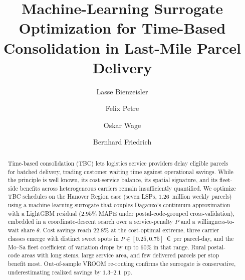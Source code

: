 \documentclass[3p,times,procedia]{elsarticle}
\begin{document}
\begin{frontmatter} 


%

\title{Machine-Learning Surrogate Optimization for Time-Based Consolidation in Last-Mile Parcel Delivery}




\author[a]{Lasse Bienzeisler} 
\author[a]{Felix Petre}
\author[b]{Oskar Wage}
\author[a]{Bernhard Friedrich}


\address[a]{Institute of Transportation and Urban Engineering, TU Braunschweig, Hermann-Blenk-Straße 42, 38108 Braunschweig, Germany}
\address[b]{Institute of Cartography and Geoinformatics, Leibniz University Hannover, Appelstraße 9a, 30167 Hannover, Germany}

\begin{abstract}
Time-based consolidation (TBC) lets logistics service providers delay eligible parcels for batched delivery, trading customer waiting time against operational savings. While the principle is well known, its cost-service balance, its spatial signature, and its fleet-side benefits across heterogeneous carriers remain insufficiently quantified. We optimize TBC schedules on the Hanover Region case (seven LSPs, $1.26$~million weekly parcels) using a machine-learning surrogate that couples Daganzo's continuum approximation with a LightGBM residual ($2.95\%$ MAPE under postal-code-grouped cross-validation), embedded in a coordinate-descent search over a service-penalty $P$ and a willingness-to-wait share $\theta$. Cost savings reach $22.8\%$ at the cost-optimal extreme, three carrier classes emerge with distinct sweet spots in $P \in [0.25, 0.75]$~\euro\ per parcel-day, and the Mo--Sa fleet coefficient of variation drops by up to $60\%$ in that range. Rural postal-code areas with long stems, large service area, and few delivered parcels per stop benefit most. Out-of-sample VROOM re-routing confirms the surrogate is conservative, underestimating realized savings by $1.3$--$2.1$~pp.








\end{abstract}
\end{frontmatter}
\end{document}
